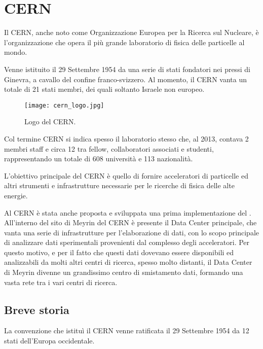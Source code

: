 \chapter{CERN} \label{chap:CERN}
	
	Il \ac{CERN}, anche noto come Organizzazione Europea per la Ricerca sul Nucleare, è l'organizzazione che opera il più grande laboratorio di fisica delle particelle al mondo.
	
	Venne istituito il 29 Settembre 1954 da una serie di stati fondatori nei pressi di Ginevra, a cavallo del confine franco-svizzero. Al momento, il CERN vanta un totale di 21 stati membri, dei quali soltanto Israele non europeo.
	
	\begin{figure}[h!]
		\begin{center}
			\texttt{[image: cern\_logo.jpg]}
		\end{center}
		\caption[Logo del CERN]{Logo del CERN.}
		\label{fig:cern_logo}
	\end{figure}
	
	Col termine \ac{CERN} si indica spesso il laboratorio stesso che, al 2013, contava 2 membri staff e circa 12 tra fellow, collaboratori associati e studenti, rappresentando un totale di 608 università e 113 nazionalità.
	
	L'obiettivo principale del \ac{CERN} è quello di fornire acceleratori di particelle ed altri strumenti e infrastrutture necessarie per le ricerche di fisica delle alte energie.
	
	Al \ac{CERN} è stata anche proposta e sviluppata una prima implementazione del . All'interno del sito di Meyrin del \ac{CERN} è presente il Data Center principale, che vanta una serie di infrastrutture per l'elaborazione di dati, con lo scopo principale di analizzare dati sperimentali provenienti dal complesso degli acceleratori. Per questo motivo, e per il fatto che questi dati dovevano essere disponibili ed analizzabili da molti altri centri di ricerca, spesso molto distanti, il Data Center di Meyrin divenne un grandissimo centro di smistamento dati, formando una vasta rete tra i vari centri di ricerca.
	
	\section{Breve storia} \label{sec:C;storia}
	
		La convenzione che istituì il \ac{CERN} venne ratificata il 29 Settembre 1954 da 12 stati dell'Europa occidentale.
		

